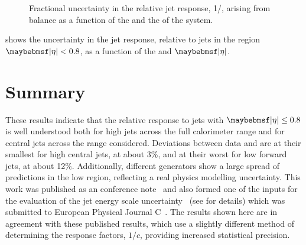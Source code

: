 \begin{figure}[htpb]
{    \label{fig:etaint:relative_jet_response_uncertainty_vs_eta}}
  \caption{Fractional uncertainty in the relative jet response, 1/\relResponse, arising from \dijet
           balance as a function of \protect{} the \pTavg
           and \protect{} the
           \pseudorap of the \dijet system.}
  \label{fig:etaint:relative_jet_response_uncertainty}
\end{figure}

 shows the uncertainty in the jet response,
relative to jets in the region $\absEta < 0.8$, as a function of the \dijet \pTavg and $\absEta$.

\section{Summary}
These results indicate that the relative response to jets with $\absEta \leq 0.8$
is well understood both for high \pT jets across the full calorimeter range and
for central jets across the \pT range considered. Deviations between
data and \MC are at their smallest for high \pT central jets, at about 3\%, and
at their worst for low \pT forward jets, at about 12\%. Additionally, different
\MC generators show a large spread of predictions in the low \pT region,
reflecting a real physics modelling uncertainty. This work was published as an
\ATLAS conference note~\cite{ATLAS-CONF-2011-014} and also formed one of
the inputs for the evaluation of the jet energy scale 
uncertainty~\cite{ATLAS-CONF-2010-056} (see  for details)
which was submitted to European Physical Journal C~\cite{CERN-PH-EP-2011-191}. The
results shown here are in agreement with these published results, which use a slightly
different method of determining the response factors, $1/c$, providing increased
statistical precision.
